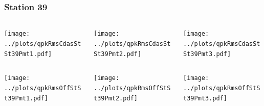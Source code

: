 \documentclass[aspectratio=169]{beamer}
\begin{document}
\begin{frame} 
  \frametitle{Station 39}
  \begin{center}
    \begin{columns}
      \begin{column}{0.33\textwidth}
        \texttt{[image: ../plots/qpkRmsCdasStSt39Pmt1.pdf]}
      \end{column}
      \begin{column}{0.33\textwidth}
        \texttt{[image: ../plots/qpkRmsCdasStSt39Pmt2.pdf]}
      \end{column}
      \begin{column}{0.33\textwidth}
        \texttt{[image: ../plots/qpkRmsCdasStSt39Pmt3.pdf]}
      \end{column}
    \end{columns}
  \end{center}

  \begin{center}
    \begin{columns}
      \begin{column}{0.33\textwidth}
        \texttt{[image: ../plots/qpkRmsOffStSt39Pmt1.pdf]}
      \end{column}
      \begin{column}{0.33\textwidth}
        \texttt{[image: ../plots/qpkRmsOffStSt39Pmt2.pdf]}
      \end{column}
      \begin{column}{0.33\textwidth}
        \texttt{[image: ../plots/qpkRmsOffStSt39Pmt3.pdf]}
      \end{column}
    \end{columns}
  \end{center}
\end{frame}
\end{document}
